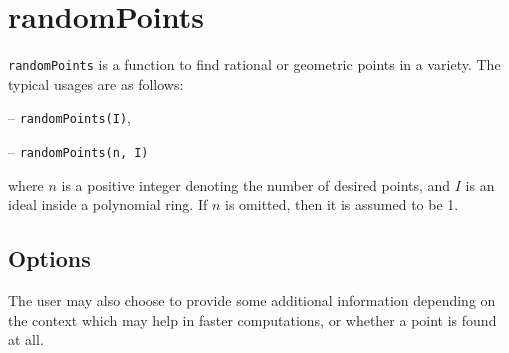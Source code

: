 \documentclass[11pt]{amsart}
\theoremstyle{definition}
\begin{document}
\section{randomPoints}\label{randomPoints}
{\tt randomPoints} is a function to find rational or geometric points in a variety. The typical usages are as follows: 

\vspace{1em}
-- {\tt randomPoints(I)}, 

-- {\tt randomPoints(n, I)} 

\vspace{1em}
\noindent where $n$ is a positive integer denoting the number of desired points, and 
$I$ is an ideal inside a polynomial ring.  If {$ n$} is omitted, then it is assumed to be 1.


\subsection{Options}\label{strategydetails}

The user may also choose to provide some additional information depending on the context which may help in faster computations, or whether a point is found at all.
\end{document}

